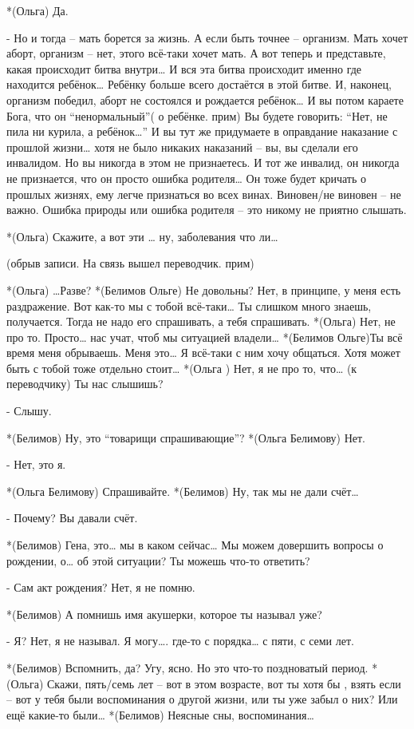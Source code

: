 *(Ольга) Да.

- Но и тогда – мать борется за жизнь. А если быть точнее – организм. Мать хочет аборт, организм – нет, этого всё-таки хочет мать. А вот теперь и представьте, какая происходит битва внутри… И вся эта битва происходит именно где находится ребёнок… Ребёнку больше всего достаётся в этой битве. И, наконец, организм победил, аборт не состоялся и рождается ребёнок… И вы потом караете Бога, что он “ненормальный”( о ребёнке. прим) Вы будете говорить: “Нет, не пила ни курила, а ребёнок…” И вы тут же придумаете в оправдание наказание с прошлой жизни… хотя не было никаких наказаний – вы, вы сделали его инвалидом. Но вы никогда в этом не признаетесь. И тот же инвалид, он никогда не признается, что он просто ошибка родителя… Он тоже будет кричать о прошлых жизнях, ему легче признаться во всех винах. Виновен/не виновен – не важно. Ошибка природы или ошибка родителя – это никому не приятно слышать.



*(Ольга) Скажите, а вот эти … ну, заболевания что ли…

(обрыв записи. На связь вышел переводчик. прим)

*(Ольга) …Разве?
*(Белимов Ольге) Не довольны? Нет, в принципе, у меня есть раздражение. Вот как-то мы с тобой всё-таки… Ты слишком много знаешь, получается. Тогда не надо его спрашивать, а тебя спрашивать.
*(Ольга) Нет, не про то. Просто… нас учат, чтоб мы ситуацией владели…
*(Белимов Ольге)Ты всё время меня обрываешь. Меня это… Я всё-таки с ним хочу общаться. Хотя может быть с тобой тоже отдельно стоит…
*(Ольга ) Нет, я не про то, что…  (к переводчику) Ты нас слышишь?

- Слышу.

*(Белимов) Ну, это “товарищи спрашивающие”?
*(Ольга Белимову) Нет.

- Нет, это я.

*(Ольга Белимову) Спрашивайте.
*(Белимов) Ну, так мы не дали счёт…

- Почему? Вы давали счёт.

*(Белимов) Гена, это… мы в каком сейчас… Мы можем довершить вопросы о рождении, о… об этой ситуации? Ты можешь что-то ответить?

- Сам акт рождения? Нет, я не помню. 

*(Белимов) А помнишь имя акушерки, которое ты называл уже?

- Я? Нет, я не называл. Я могу…. где-то с порядка… с пяти, с семи лет. 

*(Белимов) Вспомнить, да? Угу, ясно. Но это что-то поздноватый период.
*(Ольга) Скажи, пять/семь лет – вот в этом возрасте, вот ты хотя бы , взять если – вот у тебя были воспоминания о другой жизни, или ты уже забыл о них? Или ещё какие-то были…
*(Белимов) Неясные сны, воспоминания…

